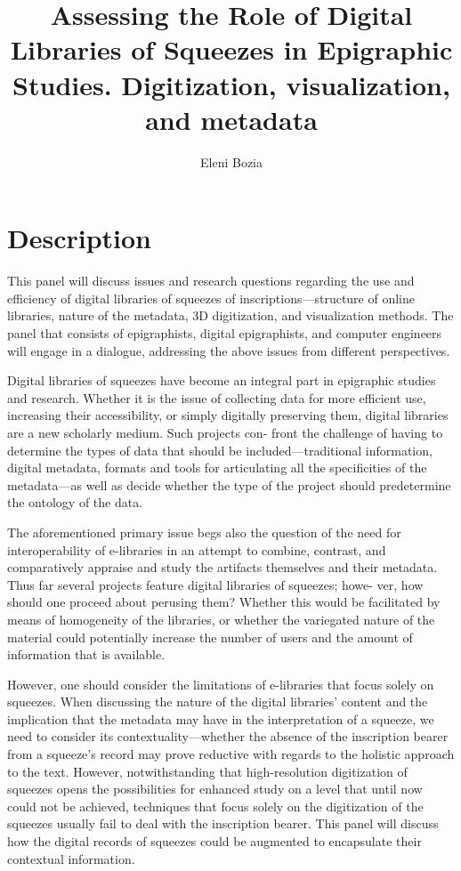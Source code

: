 \documentclass[amsthm,ebook]{saparticle}
\title{Assessing the Role of Digital Libraries of Squeezes in Epigraphic Studies. Digitization, visualization, and metadata}
\author[Flo]{Eleni Bozia\corref{first}}
\begin{document}
\maketitle


\section{Description}
This panel will discuss issues and research questions regarding the use and efficiency of digital libraries of squeezes of inscriptions—structure of online libraries, nature of the metadata, 3D digitization, and visualization methods. The panel that consists of epigraphists, digital epigraphists, and computer engineers will engage in a dialogue, addressing the above issues from different perspectives.

Digital libraries of squeezes have become an integral part in epigraphic studies and research. Whether it is the issue of collecting data for more efficient use, increasing their accessibility, or simply digitally preserving them, digital libraries are a new scholarly medium. Such projects con- front the challenge of having to determine the types of data that should be included—traditional information, digital metadata, formats and tools for articulating all the specificities of the metadata—as well as decide whether
 the type of the project should predetermine the ontology of the data.

The aforementioned primary issue begs also the question of the need for interoperability of e-libraries in an attempt to combine, contrast, and comparatively appraise and study the artifacts themselves and their metadata. Thus far several projects feature digital libraries of squeezes; howe- ver, how should one proceed about perusing them? Whether this would be facilitated by means of homogeneity of the libraries, or whether the variegated nature of the material could potentially increase the number of users and the amount of information that is available.

However, one should consider the limitations of e-libraries that focus solely on squeezes. When discussing the nature of the digital libraries’ content and the implication that the metadata may have in the interpretation of a squeeze, we need to consider its contextuality—whether the absence of the inscription bearer from a squeeze’s record may prove reductive with regards to the holistic approach to the text. However, notwithstanding that high-resolution digitization of squeezes opens the possibilities for enhanced study on a level that until now could not be achieved, techniques that focus solely on the digitization of the squeezes usually fail to deal with the inscription bearer. This panel will discuss how the digital records of squeezes could be augmented to encapsulate their contextual information.
\end{document}
